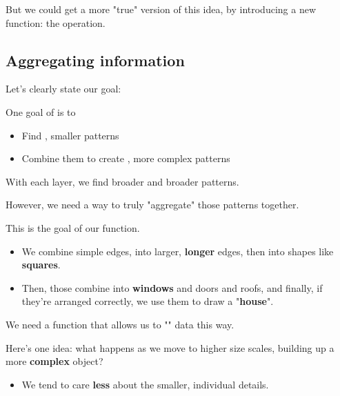     But we could get a more "true" version of this idea, by introducing a new function: the  operation.
    

    \subsection{Aggregating information}

        Let's clearly state our goal:\\

        \begin{concept}
        One goal of  is to

        \begin{itemize}
            \item Find , smaller patterns
            \item Combine them to create , more complex patterns
        \end{itemize}

        With each layer, we find broader and broader patterns.

        \subsecdiv

        However, we need a way to truly "aggregate" those patterns together.

        This is the goal of our  function.
    \end{concept}

        \begin{itemize}
            \item \miniex We combine simple edges, into larger, \textbf{longer} edges, then into shapes like \textbf{squares}. 
            \item Then, those combine into \textbf{windows} and doors and roofs, and finally, if they're arranged correctly, we use them to draw a "\textbf{house}".
        \end{itemize}

        We need a function that allows us to "" data this way.

        \subsecdiv

        Here's one idea: what happens as we move to higher size scales, building up a more \textbf{complex} object?
        

        \begin{itemize}
            \item We tend to care \textbf{less} about the smaller, individual details.
        \end{itemize}

